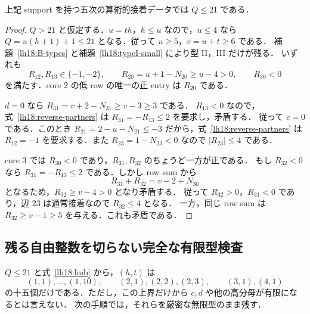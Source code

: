 \begin{proposition}[葉分母の一様な上界]\label{lh18:leaf-bound}
上記 support を持つ五次の算術的接着データでは $Q\le21$ である．
\end{proposition}

\begin{proof}
$Q>21$ と仮定する．$u=th$，$h\le u$ なので，$u\le4$ なら
$Q=u(h+1)+1\le21$ となる．従って $u\ge5$，$v=u+t\ge6$ である．
補題~\ref{lh18:B-types} と補題~\ref{lh18:typeI-small} により型 II，III だけが残る．
いずれも
\[
 R_{12},R_{13}\in\{-1,-2\},\qquad
 R_{20}=u+1-N_{20}\ge u-4>0,\qquad R_{30}<0
\]
を満たす．core $2$ の低 row の唯一の正 entry は $R_{20}$ である．

$d=0$ なら $R_{31}=v+2-N_{31}\ge v-3\ge3$ である．
$R_{13}<0$ なので，式~\eqref{lh18:reverse-partners} は
$R_{31}=-R_{13}\le2$ を要求し，矛盾する．
従って $c=0$ である．このとき
$R_{21}=2-u-N_{21}\le-3$ だから，式~\eqref{lh18:reverse-partners} は
$R_{12}=-1$ を要求する．また $R_{23}=1-N_{23}<0$ なので $|R_{23}|\le4$ である．

core $3$ では $R_{30}<0$ であり，$R_{31},R_{32}$ のちょうど一方が正である．
もし $R_{32}<0$ なら $R_{31}=-R_{13}\le2$ である．しかし row sum から
\[
 R_{31}+R_{32}=v-2+N_{30}
\]
となるため，$R_{32}\ge v-4>0$ となり矛盾する．
従って $R_{32}>0$，$R_{31}<0$ であり，辺 $23$ は通常接着なので $R_{32}\le4$ となる．
一方，同じ row sum は $R_{32}\ge v-1\ge5$ を与える．これも矛盾である．
\end{proof}

\subsection{残る自由整数を切らない完全な有限型検査}

$Q\le21$ と式~\eqref{lh18:hub} から，$(h,t)$ は
\[
 (1,1),\ldots,(1,10),\qquad (2,1),(2,2),(2,3),\qquad (3,1),(4,1)
\]
の十五個だけである．ただし，この上界だけから $c,d$ や他の高分母が有限になるとは言えない．
次の手順では，それらを厳密な無限型のまま残す．

